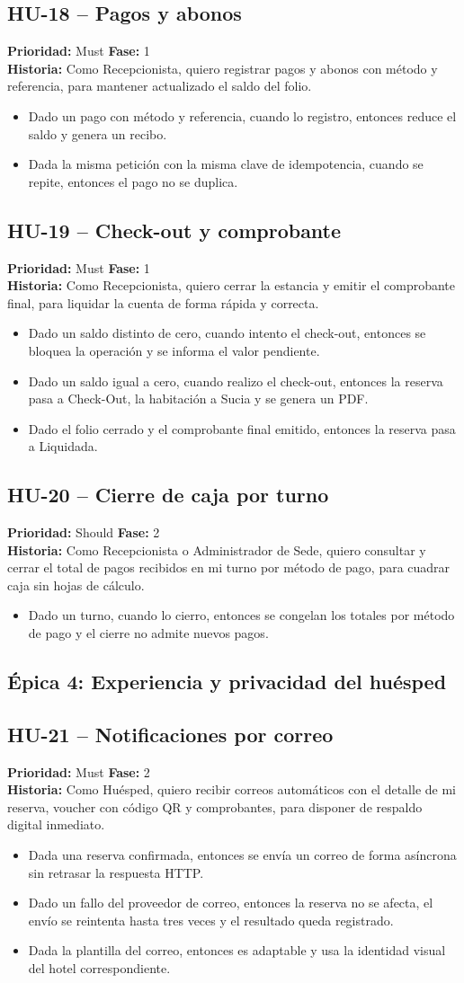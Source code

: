 \documentclass[12pt,a4paper]{article}
\newcommand{\HU}[5]{%
  \subsection*{#1 -- #2}
  \noindent\textbf{Prioridad:} #3 \hfill \textbf{Fase:} #4\\
  \noindent\textbf{Historia:} #5
  \vspace{2mm}
}
\begin{document}
\HU{HU-18}{Pagos y abonos}{Must}{1}{Como Recepcionista, quiero registrar pagos y abonos con método y referencia, para mantener actualizado el saldo del folio.}
\begin{itemize}
  \item Dado un pago con método y referencia, cuando lo registro, entonces reduce el saldo y genera un recibo.
  \item Dada la misma petición con la misma clave de idempotencia, cuando se repite, entonces el pago no se duplica.
\end{itemize}

\HU{HU-19}{Check-out y comprobante}{Must}{1}{Como Recepcionista, quiero cerrar la estancia y emitir el comprobante final, para liquidar la cuenta de forma rápida y correcta.}
\begin{itemize}
  \item Dado un saldo distinto de cero, cuando intento el check-out, entonces se bloquea la operación y se informa el valor pendiente.
  \item Dado un saldo igual a cero, cuando realizo el check-out, entonces la reserva pasa a Check-Out, la habitación a Sucia y se genera un PDF.
  \item Dado el folio cerrado y el comprobante final emitido, entonces la reserva pasa a Liquidada.
\end{itemize}

\HU{HU-20}{Cierre de caja por turno}{Should}{2}{Como Recepcionista o Administrador de Sede, quiero consultar y cerrar el total de pagos recibidos en mi turno por método de pago, para cuadrar caja sin hojas de cálculo.}
\begin{itemize}
  \item Dado un turno, cuando lo cierro, entonces se congelan los totales por método de pago y el cierre no admite nuevos pagos.
\end{itemize}

\subsection{Épica 4: Experiencia y privacidad del huésped}

\HU{HU-21}{Notificaciones por correo}{Must}{2}{Como Huésped, quiero recibir correos automáticos con el detalle de mi reserva, voucher con código QR y comprobantes, para disponer de respaldo digital inmediato.}
\begin{itemize}
  \item Dada una reserva confirmada, entonces se envía un correo de forma asíncrona sin retrasar la respuesta HTTP.
  \item Dado un fallo del proveedor de correo, entonces la reserva no se afecta, el envío se reintenta hasta tres veces y el resultado queda registrado.
  \item Dada la plantilla del correo, entonces es adaptable y usa la identidad visual del hotel correspondiente.
\end{itemize}
\end{document}
